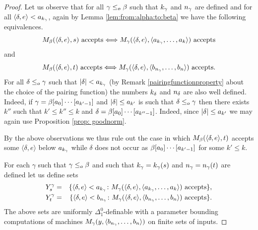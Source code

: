 \documentclass[11pt]{amsart}
\theoremstyle{definition}
\theoremstyle{remark}
\theoremstyle{plain}
\def\la{\langle}
\def\ra{\rangle}
\newcommand{\set}[1]{{\{{#1}\}}}
\newcommand{\leqo}{\leq\sb{o}}
\def\ifff{\Longleftrightarrow}
\begin{document}
\begin{proof}
Let us observe that for all $\gamma\leqo\beta$ such that $k\sb\gamma$ and $n\sb\gamma$ are defined and for all $\la\delta,e\ra<a\sb{k\sb\gamma}$, again by Lemma \ref{lem:from:alpha:to:beta} we have the following equivalences.
$$
M\sb\beta(\la\delta,e\ra,s)\mbox{ accepts} \ifff          M\sb\gamma(\la\delta,e\ra,\langle a\sb{k\sb\gamma},\dots, a\sb k \rangle)\mbox{ accepts}
$$
and
$$
M\sb\beta(\la\delta,e\ra,t)\mbox{ accepts}\ifff  M\sb\gamma(\la\delta,e\ra,\langle b\sb{n\sb\gamma},\dots, b\sb n\rangle)\mbox{ accepts}.
$$
For all $\delta \leqo\gamma$ such that $|\delta|< a\sb{k\sb\gamma}$ (by Remark \ref{pairingfunctionproperty} about the choice of the pairing function) the numbers $k\sb\delta$ and $n\sb\delta$ are also well defined. 
Indeed, if $\gamma=\beta[a\sb0]\cdots [a\sb{k'-1}]$ and $|\delta|\leq a\sb{k'}$ is such that $\delta\leqo\gamma$ then there exists $k''$ such that $k'\leq k''\leq k$ and $\delta=\beta[a\sb0]\cdots [a\sb{k''-1}]$. 
Indeed, since $|\delta|\leq a\sb{k'}$  we may again use Proposition \ref{prop: goodnorm}.

By the above observations we thus rule out the case in which $M\sb\beta(\la \delta,e \ra,t)$ accepts some $\la\delta,e\ra$ below $a\sb{k\sb\gamma}$ while $\delta$ does not occur as $\beta [a\sb0]\cdots [a\sb{k'-1}]$ for some $k'\leq k$.

For each $\gamma$ such that $\gamma \leqo\beta$ and such that $k\sb\gamma=k\sb\gamma(s)$ and $n\sb\gamma=n\sb\gamma(t)$ are defined let us define sets
\begin{eqnarray*}
Y\sp {\gamma}\sb{s}&=&
\set{\la\delta,e\ra<a\sb{k\sb\gamma}\colon M\sb\gamma(\la\delta,e\ra,\langle a\sb{k\sb\gamma},\dots,a\sb k\rangle)\mbox{ accepts}},\\
Y\sp{\gamma}\sb{t}&=&      \set{\la\delta,e\ra<b\sb{n\sb\gamma }\colon M\sb\gamma(\la\delta,e\ra,\langle b\sb{n\sb\gamma},\dots,b\sb n\rangle)\mbox{ accepts}}.
\end{eqnarray*}
The above sets are uniformly $\Delta^0_1$-definable with a parameter bounding computations of machines $M\sb\gamma (y,\langle b\sb{n\sb\gamma},\dots,b\sb n\rangle)$ on finite sets of inputs.


\end{proof}
\end{document}
